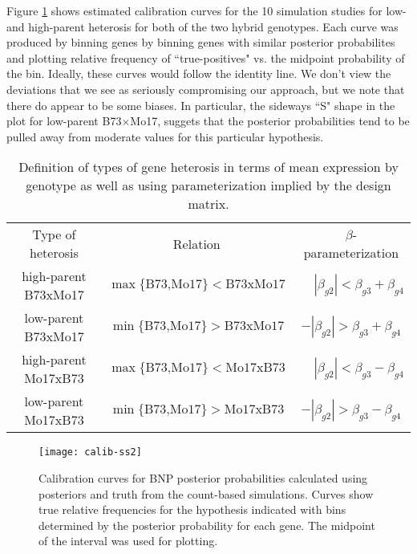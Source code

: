 Figure \ref{calib-ss2} shows estimated calibration curves for the 10 simulation studies for low- and high-parent heterosis for both of the two hybrid genotypes. Each curve was produced by binning genes by binning genes with similar posterior probabilites and plotting relative frequency of ``true-positives" vs. the midpoint probability of the bin. Ideally, these curves would follow the identity line. We don't view the deviations that we see as seriously compromising our approach, but we note that there do appear to be some biases. In particular, the sideways ``S" shape in the plot for low-parent B73$\times$Mo17, suggets that the posterior probabilities tend to be pulled away from moderate values for this particular hypothesis. 

\begin{table}
\caption{Definition of types of gene heterosis in terms of mean expression by genotype as well as using parameterization implied by the design matrix.}
\label{def-heterosis}
\begin{tabular}{ccc}
Type of heterosis & Relation & $\beta$-parameterization\\
high-parent B73xMo17 & $\max\{\mbox{B73,Mo17}\} < \mbox{B73xMo17}$ & $\phantom{-}|\beta_{g2}| < \beta_{g3} + \beta_{g4}$\\
low-parent B73xMo17  & $\min\{\mbox{B73,Mo17}\} > \mbox{B73xMo17}$ & $-|\beta_{g2}| > \beta_{g3} + \beta_{g4}$\\
high-parent Mo17xB73 & $\max\{\mbox{B73,Mo17}\} < \mbox{Mo17xB73}$ & $\phantom{-}|\beta_{g2}| < \beta_{g3} - \beta_{g4}$\\
low-parent Mo17xB73  & $\min\{\mbox{B73,Mo17}\} > \mbox{Mo17xB73}$ & $-|\beta_{g2}| > \beta_{g3} - \beta_{g4}$
\end{tabular}
\end{table}



\begin{figure}[ht!]
\centering
\texttt{[image: calib-ss2]}
\begin{minipage}{.8\textwidth}
\caption{\small Calibration curves for BNP posterior probabilities calculated using posteriors and truth from the count-based simulations. Curves show true relative frequencies for the hypothesis indicated with bins determined by the posterior probability for each gene. The midpoint of the interval was used for plotting.}
\label{calib-ss2}
\end{minipage}
\end{figure}

